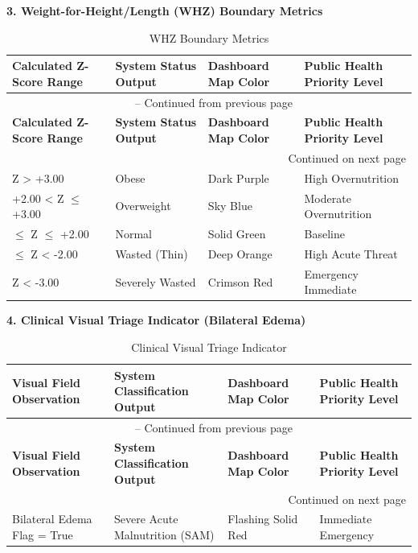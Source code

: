 \documentclass[12pt, a4paper]{report}
\begin{document}
\noindent \textbf{3. Weight-for-Height/Length (WHZ) Boundary Metrics}

\vspace{0.3cm}
\begin{longtable}{p{2.5cm} p{2.5cm} p{2.5cm} p{3.5cm}}
    \caption{WHZ Boundary Metrics} \label{tab:whz_metrics} \\
    \toprule
    \textbf{Calculated Z-Score Range} & \textbf{System Status Output} & \textbf{Dashboard Map Color} & \textbf{Public Health Priority Level} \\
    \midrule
    \endfirsthead
    \multicolumn{4}{c}{{\tablename\ \thetable{} -- Continued from previous page}} \\
    \toprule
    \textbf{Calculated Z-Score Range} & \textbf{System Status Output} & \textbf{Dashboard Map Color} & \textbf{Public Health Priority Level} \\
    \midrule
    \endhead
    \midrule
    \multicolumn{4}{r}{{Continued on next page}} \\
    \endfoot
    \bottomrule
    \endlastfoot
    Z > +3.00 & Obese & Dark Purple & High Overnutrition \\
    \addlinespace
    +2.00 < Z \(\leq\) +3.00 & Overweight & Sky Blue & Moderate Overnutrition \\
    \addlinespace
    -2.00 \(\leq\) Z \(\leq\) +2.00 & Normal & Solid Green & Baseline \\
    \addlinespace
    -3.00 \(\leq\) Z < -2.00 & Wasted (Thin) & Deep Orange & High Acute Threat \\
    \addlinespace
    Z < -3.00 & Severely Wasted & Crimson Red & Emergency Immediate \\
\end{longtable}
\vspace{0.3cm}

\noindent \textbf{4. Clinical Visual Triage Indicator (Bilateral Edema)}

\vspace{0.3cm}
\begin{longtable}{p{3.5cm} p{3.5cm} p{3cm} p{3cm}}
    \caption{Clinical Visual Triage Indicator} \label{tab:triage} \\
    \toprule
    \textbf{Visual Field Observation} & \textbf{System Classification Output} & \textbf{Dashboard Map Color} & \textbf{Public Health Priority Level} \\
    \midrule
    \endfirsthead
    \multicolumn{4}{c}{{\tablename\ \thetable{} -- Continued from previous page}} \\
    \toprule
    \textbf{Visual Field Observation} & \textbf{System Classification Output} & \textbf{Dashboard Map Color} & \textbf{Public Health Priority Level} \\
    \midrule
    \endhead
    \midrule
    \multicolumn{4}{r}{{Continued on next page}} \\
    \endfoot
    \bottomrule
    \endlastfoot
    Bilateral Edema Flag = True & Severe Acute Malnutrition (SAM) & Flashing Solid Red & Immediate Emergency \\
\end{longtable}
\vspace{0.3cm}
\end{document}
